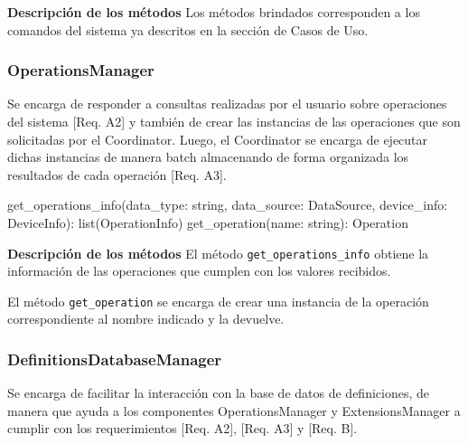 \textbf{Descripción de los métodos} \newline
Los métodos brindados corresponden a los comandos del sistema ya descritos en la sección de Casos de Uso.

\subsubsection{OperationsManager}
Se encarga de responder a consultas realizadas por el usuario sobre operaciones del sistema [Req. A2] y también de crear las instancias de las operaciones que son solicitadas por el Coordinator. Luego, el Coordinator se encarga de ejecutar dichas instancias de manera batch almacenando de forma organizada los resultados de cada operación [Req. A3].
\newline

\begin{python}[title=Interfaz OperationsManager, captionpos=b]
get_operations_info(data_type: string, data_source: DataSource, 
                    device_info: DeviceInfo): list(OperationInfo)
get_operation(name: string): Operation
\end{python}

\textbf{Descripción de los métodos} \newline
El método \texttt{get\_operations\_info} obtiene la información de las operaciones que cumplen con los valores recibidos.

El método \texttt{get\_operation} se encarga de crear una instancia de la operación correspondiente al nombre indicado y la devuelve.

\subsubsection{DefinitionsDatabaseManager}
Se encarga de facilitar la interacción con la base de datos de definiciones, de manera que ayuda a los componentes OperationsManager y ExtensionsManager a cumplir con los requerimientos [Req. A2], [Req. A3] y [Req. B].
\newline

